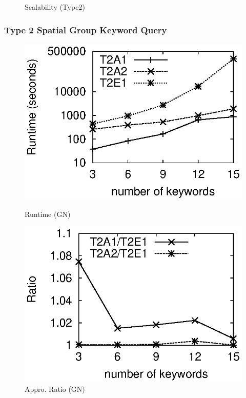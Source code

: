 \documentclass{sig-alternate}
\begin{document}
\begin{figure}[h]
\begin{minipage}[bt]{1.6in}
\caption{Scalability (Type2)}  \label{fig:scalability2}
\end{minipage}
\end{figure}

\subsubsection{Type 2 Spatial Group Keyword Query}
\label{sec:ex:type2}


\begin{figure}[h]
\vspace{-1ex}
\begin{minipage}[bt]{1.6in}
 \includegraphics[scale=0.5]{figure/GNtime2}\vspace{-2ex}
\caption{Runtime (GN)} \label{fig:gntime2}
\end{minipage}\hspace{2mm}
\begin{minipage}[bt]{1.6in}
 \includegraphics[scale=0.5]{figure/GNratio2}\vspace{-2ex}
\caption{Appro. Ratio (GN)} \label{fig:gnratio2}
\end{minipage}
\end{figure}
\end{document}
